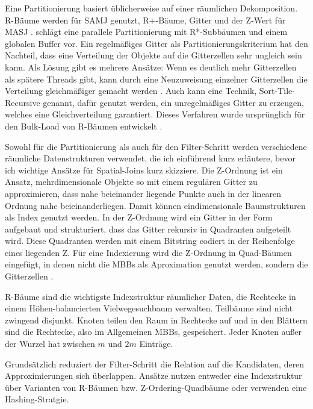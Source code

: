 \documentclass[a4paper,12pt,twoside]{article}
\begin{document}
Eine Partitionierung basiert üblicherweise auf einer räumlichen Dekomposition. R-Bäume werden für SAMJ genutzt, R+-Bäume, Gitter und der Z-Wert für MASJ {\autocite{Zhou1998}}. {\textcite{Brinkhoff1996}} schlägt eine parallele Partitionierung mit R*-Subbäumen und einem globalen Buffer vor. Ein regelmäßiges Gitter als Partitionierungskriterium hat den Nachteil, dass eine Verteilung der Objekte auf die Gitterzellen sehr ungleich sein kann. Als Lösung gibt es mehrere Ansätze: Wenn es deutlich mehr Gitterzellen als spätere Threads gibt, kann durch eine Neuzuweisung einzelner Gitterzellen die Verteilung gleichmäßiger gemacht werden {\autocite{Patel1996}}. Auch kann eine Technik, Sort-Tile-Recursive genannt, dafür genutzt werden, ein unregelmäßiges Gitter zu erzeugen, welches eine Gleichverteilung garantiert. Dieses Verfahren wurde ursprünglich für den Bulk-Load von R-Bäumen entwickelt {\autocite{Leutenegger1997}}.

Sowohl für die Partitionierung als auch für den Filter-Schritt werden verschiedene räumliche Datenstrukturen verwendet, die ich einführend kurz erläutere, bevor ich wichtige Ansätze für Spatial-Joins kurz skizziere. Die Z-Ordnung ist ein Ansatz, mehrdimensionale Objekte so mit einem regulären Gitter zu approximieren, dass nahe beieinander liegende Punkte auch in der linearen Ordnung nahe beieinanderliegen. Damit können eindimensionale Baumstrukturen als Index genutzt werden. In der Z-Ordnung wird ein Gitter in der Form aufgebaut und strukturiert, dass das Gitter rekursiv in Quadranten aufgeteilt wird. Diese Quadranten werden mit einem Bitstring codiert in der Reihenfolge eines liegenden Z. Für eine Indexierung wird die Z-Ordnung in Quad-Bäumen eingefügt, in denen nicht die MBBs als Aproximation genutzt werden, sondern die Gitterzellen {\autocite[S. 227ff]{Rigaux2001}}.

R-Bäume sind die wichtigste Indexstruktur räumlicher Daten, die Rechtecke in einem Höhen-balancierten Vielwegesuchbaum verwalten. Teilbäume sind nicht zwingend disjunkt. Knoten teilen den Raum in Rechtecke auf und in den Blättern sind die Rechtecke, also im Allgemeinen MBBs, gespeichert. Jeder Knoten außer der Wurzel hat zwischen $m$ und $2 m$ Einträge.

Grundsätzlich reduziert der Filter-Schritt die Relation auf die Kandidaten, deren Approximierungen sich überlappen. Ansätze nutzen entweder eine Indexstruktur über Varianten von R-Bäumen bzw. Z-Ordering-Quadbäume oder verwenden eine Hashing-Stratgie.
\end{document}
